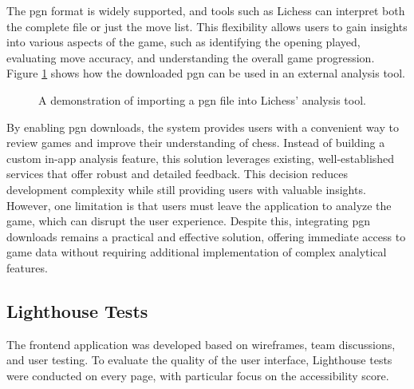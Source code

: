 The \gls{pgn} format is widely supported, and tools such as Lichess can interpret both the complete file or just the move list. This flexibility allows users to gain insights into various aspects of the game, such as identifying the opening played, evaluating move accuracy, and understanding the overall game progression. Figure \ref{fig:downloaded-pgn-analysis} shows how the downloaded \gls{pgn} can be used in an external analysis tool. \\

\begin{figure}[h!] 
    \centering 
    \caption[Lichess' analysis tool]{A demonstration of importing a \gls{pgn} file into Lichess' analysis tool.}
    \label{fig:downloaded-pgn-analysis} 
\end{figure}

By enabling \gls{pgn} downloads, the system provides users with a convenient way to review games and improve their understanding of chess. Instead of building a custom in-app analysis feature, this solution leverages existing, well-established services that offer robust and detailed feedback. This decision reduces development complexity while still providing users with valuable insights. \\

However, one limitation is that users must leave the application to analyze the game, which can disrupt the user experience. Despite this, integrating \gls{pgn} downloads remains a practical and effective solution, offering immediate access to game data without requiring additional implementation of complex analytical features.

\subsection{Lighthouse Tests}
The frontend application was developed based on wireframes, team discussions, and user testing. To evaluate the quality of the user interface, Lighthouse tests were conducted on every page, with particular focus on the accessibility score. \\

